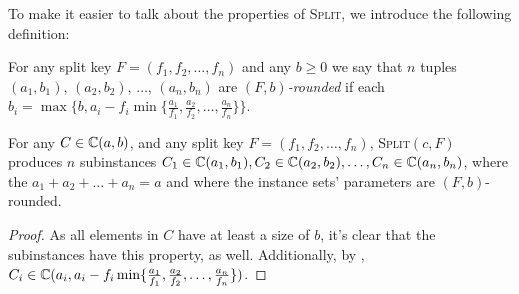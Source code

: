 \documentclass[%
    a4paper,              %
    style=screen,          %
    bibliography=totoc,   %
    nexus,                %
    lnum,                 %
    extramargin,          %
]{tubsbook}
\begin{document}
To make it easier to talk about the properties of \textsc{Split}, we introduce the following definition:


\begin{definition}\label{def:rounded}
    For any split key $F = (f_1, f_2, \dots, f_n)$ and any $b \ge 0$ we say that $n$ tuples $(a_1, b_1)$, $(a_2, b_2)$, $\dots$, $(a_n, b_n)$ are \emph{$(F,b)$-rounded} if each $b_i = \max\{b,a_i - f_i \min\{\frac{a_1}{f_1}, \frac{a_2}{f_2}, \dots, \frac{a_n}{f_n}\}\}$.
\end{definition}

\begin{lemma}\label{th:split-sets}
    For any $C \in \mathbb{C}(a,b)$, and any split key $F = (f_1, f_2, \dots, f_n)$, \textsc{Split}$(c,F)$ produces $n$ subinstances $C_1 \in \mathbb{C}(a_1, b_1), C_2 \in \mathbb{C}(a_2, b_2), \dots, C_n \in \mathbb{C}(a_n, b_n)$, where the $a_1 + a_2 + \dots + a_n = a$ and where the instance sets' parameters are $(F,b)$-rounded.
\end{lemma}

\begin{proof}
    As all elements in $C$ have at least a size of $b$, it's clear that the subinstances have this property, as well. Additionally, by , $C_i \in \mathbb{C}(a_i, a_i - f_i \min\{\frac{a_1}{f_1}, \frac{a_2}{f_2}, \dots, \frac{a_n}{f_n}\})$.
\end{proof}

\end{document}
